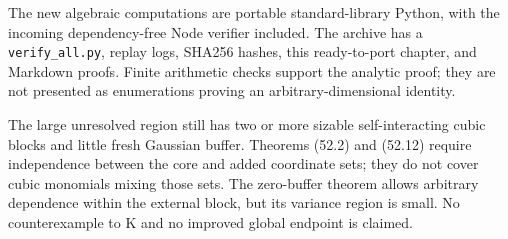 The new algebraic computations are portable standard-library Python,
with the incoming dependency-free Node verifier included.
The archive has a \texttt{verify\_all.py}, replay logs, SHA256 hashes,
this ready-to-port chapter, and Markdown proofs.
Finite arithmetic checks support the analytic proof; they are not
presented as enumerations proving an arbitrary-dimensional identity.

The large unresolved region still has two or more sizable
self-interacting cubic blocks and little fresh Gaussian buffer.
Theorems (52.2) and (52.12) require independence between the core and
added coordinate sets; they do not cover cubic monomials mixing those
sets. The zero-buffer theorem allows arbitrary dependence within the
external block, but its variance region is small.
No counterexample to K and no improved global endpoint is claimed.
